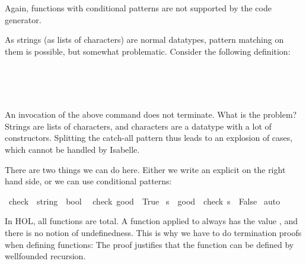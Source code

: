 \begin{isabellebody}
\begin{isamarkuptext}
  Again, functions with conditional patterns are not supported by the
  code generator.%
\end{isamarkuptext}%
\isamarkuptrue%
%
\isamarkuptrue%
%
\begin{isamarkuptext}%
As strings (as lists of characters) are normal datatypes, pattern
  matching on them is possible, but somewhat problematic. Consider the
  following definition:

\end{isamarkuptext}
\noindent{} \\%
\\%
\hspace*{2ex}\\%
\begin{isamarkuptext}

  \noindent An invocation of the above  command does not
  terminate. What is the problem? Strings are lists of characters, and
  characters are a datatype with a lot of constructors. Splitting the
  catch-all pattern thus leads to an explosion of cases, which cannot
  be handled by Isabelle.

  There are two things we can do here. Either we write an explicit
   on the right hand side, or we can use conditional patterns:%
\end{isamarkuptext}%
\isamarkuptrue%
\isamarkupfalse%
\ check\ {\isacharcolon}{\isacharcolon}\ {\isachardoublequoteopen}string\ {\isasymRightarrow}\ bool{\isachardoublequoteclose}\isanewline
{}\isanewline
\ \ {\isachardoublequoteopen}check\ {\isacharparenleft}{\isacharprime}{\isacharprime}good{\isacharprime}{\isacharprime}{\isacharparenright}\ {\isacharequal}\ True{\isachardoublequoteclose}\isanewline
{\isacharbar}\ {\isachardoublequoteopen}s\ {\isasymnoteq}\ {\isacharprime}{\isacharprime}good{\isacharprime}{\isacharprime}\ {\isasymLongrightarrow}\ check\ s\ {\isacharequal}\ False{\isachardoublequoteclose}\isanewline
%
\isadelimproof
%
\endisadelimproof
%
\isatagproof
{}\isamarkupfalse%
\ auto%
\endisatagproof
{\isafoldproof}%
%
\isadelimproof
%
\endisadelimproof
%
\isamarkuptrue%
%
\begin{isamarkuptext}%
In HOL, all functions are total. A function  applied to
   always has the value , and there is no notion
  of undefinedness. 
  This is why we have to do termination
  proofs when defining functions: The proof justifies that the
  function can be defined by wellfounded recursion.


\end{isamarkuptext}
\end{isabellebody}
